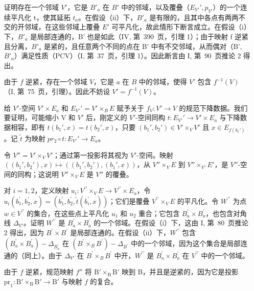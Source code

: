 证明存在一个邻域 \(V'\)，它是 \(B'_{a}\) 在 \(B'\) 中的邻域，以及覆叠（\(E_{V'}', p_{V'}\)）的一个连续平凡化 t，使其延拓 \(t_{a}\)。在假设（ii）下，\(B'_{a}\) 是有限的，且其中各点有两两不交的开邻域，在这些邻域上覆叠 \(E'\) 可平凡化，故此情形下断言成立。在假设（i）下，\(B'_{a}\) 是局部连通的，B' 也是如此（IV, 第~390~页，引理 1）；由于映射 f 逆紧且分离，\(B'_{a}\) 是紧的，且任意两个不同的点在 B' 中有不交邻域，从而偶对（B', \(B'_{a}\)）满足性质（PCV）（I, 第~37~页，引理 1）。因此断言由 I, 第~90~页推论 2 得出。

由于 \(f\) 逆紧，存在一个邻域 \(V\)，它是 \(a\) 在 \(B\) 中的邻域，使得 \(V'\) 包含 \(f^{-1}(V)\)（I, 第~75~页，引理）。因此不妨设 \(V' = f^{-1}(V)\)。

给 \(V'\)-空间 \(V' \times E_{a}\) 和 \(E_{V'}' = V' \times_{B} E\) 赋予关于 \(f_{V}: V' \to V\) 的规范下降数据。我们要证明，可能缩小 V 和 \(V'\) 后，刚定义的 \(V'\)-空间同构 \(t: E_{V'}' \to V' \times E_{a}\) 与下降数据相容，即有 \(t(b_{1}', x) = t(b_{2}', x)\)，只要 \((b_{1}', b_{2}') \in V' \times_{V} V'\) 且 \(x \in E_{f(b_{1}')}\)。记 \(\widetilde{t}\) 为映射 \(pr_{2} \circ t: E_{V'}' \to E_{a}\)。

令 \(V'' = V' \times_{V} V'\)；通过第一投影将其视为 \(V'\)-空间。映射 \(((b_{1}', b_{2}'), x) \mapsto ((b_{1}', b_{2}'), (b_{1}', x))\)，从 \(V'' \times_{V} E\) 到 \(V'' \times_{V'} E'\)，是 \(V''\)-空间的同构；这说明 \(V'' \times_{V} E\) 是 \(V''\) 的覆叠。

对 \(i=1,2\)，定义映射 \(u_{i}\colon V^{\prime\prime}\times_{V}E\to V^{\prime\prime}\times E_{a}\)，令 \(u_{i}(b_{1}^{\prime},b_{2}^{\prime},x)=(b_{1}^{\prime},b_{2}^{\prime},\widetilde{t}(b_{i}^{\prime},x))\)；它们是覆叠 \(V^{\prime\prime}\times_{V}E\) 的平凡化。令 \(W^{\prime\prime}\) 为点 \(w\in V^{\prime\prime}\) 的集合，在这些点上平凡化 \(u_{1}\) 和 \(u_{2}\) 重合；它包含 \(B_{a}^{\prime}\times B_{a}^{\prime}\)，也包含对角线 \(\Delta_{V'}\)。证明 \(W^{\prime\prime}\) 是 \(B_{a}^{\prime}\times B_{a}^{\prime}\) 的一个邻域。在假设（i）下，这由 I, 第~80~页推论 2 得出，因为 \(B^{\prime}\times B^{\prime}\) 是局部连通的。在假设（ii）下，\(W^{\prime\prime}\) 包含 \((B_{a}^{\prime}\times B_{a}^{\prime})-\Delta_{B_{a}^{\prime}}\) 在 \((B^{\prime}\times_{B}B^{\prime})-\Delta_{B^{\prime}}\) 中的一个邻域，因为这个集合是局部连通的（同上）。由于 \(\Delta_{V'}\) 在 \(B^{\prime}\times_{B}B^{\prime}\) 中开，\(W^{\prime\prime}\) 是 \(B_{a}^{\prime}\times B_{a}^{\prime}\) 在 \(V^{\prime\prime}\) 中的一个邻域。

由于 \(f\) 逆紧，规范映射 \(f''\) 将 \(\mathrm{B}' \times_{\mathrm{B}} \mathrm{B}'\) 映到 B，并且是逆紧的，因为它是投影 \(\mathrm{pr}_{1} \colon \mathrm{B}' \times_{\mathrm{B}} \mathrm{B}' \to \mathrm{B}'\) 与映射 \(f\) 的复合。

